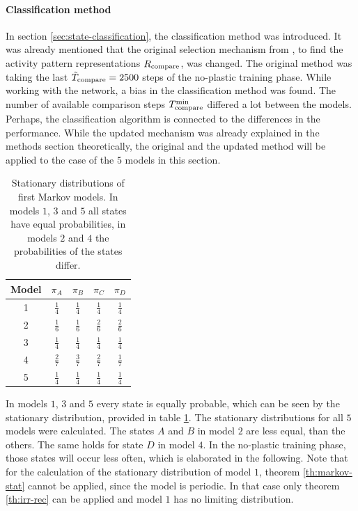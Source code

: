 \paragraph{Classification method}

In section \ref{sec:state-classification}, the classification method was introduced. It was already mentioned that the original selection mechanism from \textcite{hartmann2015s}, to find the activity pattern representations $R_{\text{compare}}$, was changed. The original method was taking the last $\tilde{T}_{\text{compare}} = 2500$ steps of the no-plastic training phase. While working with the network, a bias in the classification method was found. The number of available comparison steps $T_{\text{compare}}^{\text{min}}$ differed a lot between the models. Perhaps, the classification algorithm is connected to the differences in the performance. While the updated mechanism was already explained in the methods section theoretically, the original and the updated method will be applied to the case of the $5$ models in this section.

\begin{table}[!b]
\centering
\begin{tabular}{c|cccc}
Model & $\pi_A$ & $\pi_B$ & $\pi_C$ & $\pi_D$ \\
\hline
1 & $\frac{1}{4}$ & $\frac{1}{4}$ & $\frac{1}{4}$ & $\frac{1}{4}$ \\
2 & $\frac{1}{6}$ & $\frac{1}{6}$ & $\frac{2}{6}$ & $\frac{2}{6}$ \\
3 & $\frac{1}{4}$ & $\frac{1}{4}$ & $\frac{1}{4}$ & $\frac{1}{4}$ \\
4 & $\frac{2}{7}$ & $\frac{3}{7}$ & $\frac{2}{7}$ & $\frac{1}{7}$ \\
5 & $\frac{1}{4}$ & $\frac{1}{4}$ & $\frac{1}{4}$ & $\frac{1}{4}$
\end{tabular}
\vspace{5pt}
\caption[Stationary distributions of model series I]{Stationary distributions of first Markov models. In models $1$, $3$ and $5$ all states have equal probabilities, in models $2$ and $4$ the probabilities of the states differ.}
\label{tb:mc1-stat}
\end{table}

In models $1$, $3$ and $5$ every state is equally probable, which can be seen by the stationary distribution, provided in table \ref{tb:mc1-stat}. The stationary distributions for all $5$ models were calculated. The states $A$ and $B$ in model $2$ are less equal, than the others. The same holds for state $D$ in model $4$. In the no-plastic training phase, those states will occur less often, which is elaborated in the following. Note that for the calculation of the stationary distribution of model $1$, theorem \ref{th:markov-stat} cannot be applied, since the model is periodic. In that case only theorem \ref{th:irr-rec} can be applied and model $1$ has no limiting distribution.

